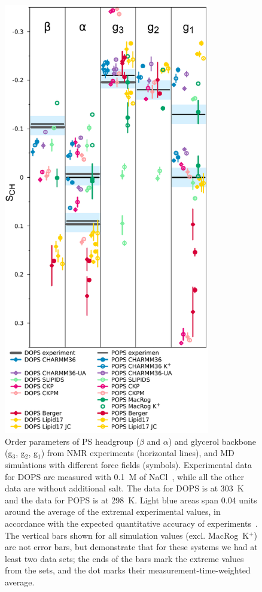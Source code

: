 \documentclass[aps,prl,superscriptaddress,twocolumn]{revtex4}
\begin{document}
\begin{figure}[]
  \centering
  \includegraphics[width=9.0cm]{../Figs/HGorderparametersPS.pdf}
  \caption{\label{HGorderParametersPS}
    Order parameters of PS headgroup ($\beta$ and $\alpha$) and
    glycerol backbone (g$_3$, g$_2$, g$_1$) from NMR experiments (horizontal lines),
    and MD simulations with different force fields (symbols).
    Experimental data for DOPS are measured with 0.1~M of NaCl~\cite{browning80},
    while all the other data are without additional salt.
    The data for DOPS is at 303~K and the data for POPS is at 298~K.
    Light blue areas span 0.04 units around the average of the extremal experimental values,
    in accordance with the expected quantitative accuracy of experiments~\cite{ollila16}.
    The vertical bars shown for all simulation values (excl. MacRog~K$^+$)
    are not error bars, but demonstrate that for these systems
    we had at least two data sets; the ends of the bars mark the extreme values
    from the sets, and the dot marks their measurement-time-weighted average.
  }
\end{figure}
\end{document}
